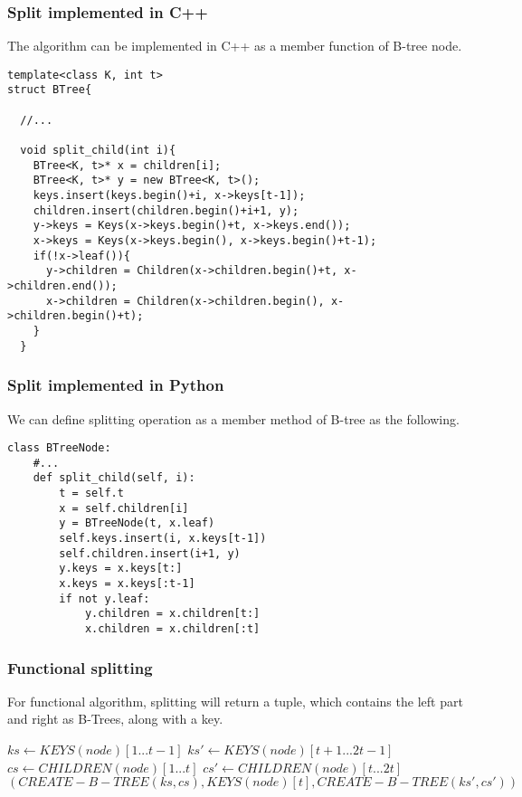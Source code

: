 \documentclass{article}
\begin{document}
\subsubsection*{Split implemented in C++}
The algorithm can be implemented in C++ as a member function of
B-tree node.

\lstset{language=C++}
\begin{lstlisting}
template<class K, int t>
struct BTree{

  //...

  void split_child(int i){
    BTree<K, t>* x = children[i];
    BTree<K, t>* y = new BTree<K, t>();
    keys.insert(keys.begin()+i, x->keys[t-1]);
    children.insert(children.begin()+i+1, y);
    y->keys = Keys(x->keys.begin()+t, x->keys.end());
    x->keys = Keys(x->keys.begin(), x->keys.begin()+t-1);
    if(!x->leaf()){
      y->children = Children(x->children.begin()+t, x->children.end());
      x->children = Children(x->children.begin(), x->children.begin()+t);
    }
  }
\end{lstlisting}

\subsubsection*{Split implemented in Python}
We can define splitting operation as a member method of B-tree
as the following.

\lstset{language=Python}
\begin{lstlisting}
class BTreeNode:
    #...
    def split_child(self, i):
        t = self.t
        x = self.children[i]
        y = BTreeNode(t, x.leaf)
        self.keys.insert(i, x.keys[t-1])
        self.children.insert(i+1, y)
        y.keys = x.keys[t:]
        x.keys = x.keys[:t-1]
        if not y.leaf:
            y.children = x.children[t:]
            x.children = x.children[:t]
\end{lstlisting}

\subsubsection{Functional splitting}

For functional algorithm, splitting will return a tuple, which contains the
left part and right as B-Trees, along with a key.

\begin{algorithmic}[1]
  \State $ks \leftarrow KEYS(node)[1 ... t-1]$
  \State $ks' \leftarrow KEYS(node)[t+1 ... 2t-1]$
    \State $cs \leftarrow CHILDREN(node)[1 ... t]$
    \State $cs' \leftarrow CHILDREN(node)[t ... 2t]$
  \EndIf
  \State \Return $(CREATE-B-TREE(ks, cs), KEYS(node)[t], CREATE-B-TREE(ks', cs'))$
\EndFunction
\end{algorithmic}
\end{document}
